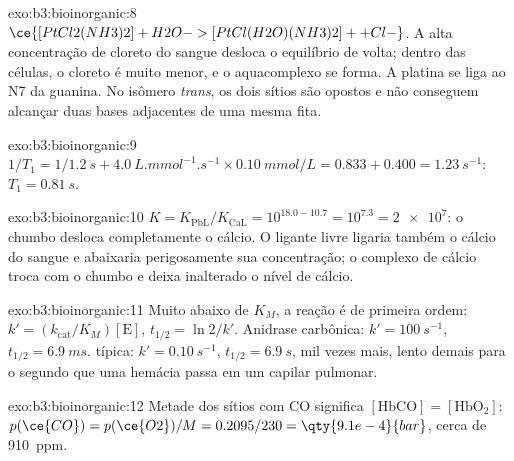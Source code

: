 \begin{solution}{exo:b3:bioinorganic:8}
$\ce{[PtCl2(NH3)2] + H2O -> [PtCl(H2O)(NH3)2]+ + Cl-}$. A alta concentração de cloreto do sangue
desloca o equilíbrio de volta; dentro das células, o cloreto é muito menor, e o
aquacomplexo se forma. A platina se liga ao N7 da guanina. No isômero \textit{trans}, os dois
sítios  são opostos e não conseguem alcançar duas bases adjacentes de uma mesma
fita.
\end{solution}

\begin{solution}{exo:b3:bioinorganic:9}
$1/T_1 = 1/\qty{1.2}{s} + \qty{4.0}{L.mmol^{-1}.s^{-1}} \times \qty{0.10}{mmol/L} = 0.833 + 0.400 = \qty{1.23}{s^{-1}}$: $T_1 = \qty{0.81}{s}$.
\end{solution}

\begin{solution}{exo:b3:bioinorganic:10}
$K = K_{\mathrm{PbL}}/K_{\mathrm{CaL}} = 10^{18.0 - 10.7} = 10^{7.3} = \num{2e7}$: o chumbo desloca completamente o cálcio. O ligante
livre ligaria também o cálcio do sangue e abaixaria perigosamente sua concentração;
o complexo de cálcio troca com o chumbo e deixa inalterado o nível
de cálcio.
\end{solution}

\begin{solution}{exo:b3:bioinorganic:11}
Muito abaixo de $K_M$, a reação é de primeira ordem: $k' = (k_{\mathrm{cat}}/K_M)[\mathrm E]$, $t_{1/2} = \ln 2/k'$. Anidrase
carbônica: $k' = \qty{100}{s^{-1}}$, $t_{1/2} = \qty{6.9}{ms}$.  típica: $k' = \qty{0.10}{s^{-1}}$, $t_{1/2} = \qty{6.9}{s}$, mil
vezes mais, lento demais para o segundo que uma hemácia passa em um capilar pulmonar.
\end{solution}

\begin{solution}{exo:b3:bioinorganic:12}
Metade dos sítios com CO significa $[\mathrm{HbCO}] = [\mathrm{HbO_2}]$: $p(\ce{CO}) = p(\ce{O2})/M = 0.2095/230 = \qty{9.1e-4}{bar}$, cerca de
\qty{910}{ppm}.
\end{solution}

